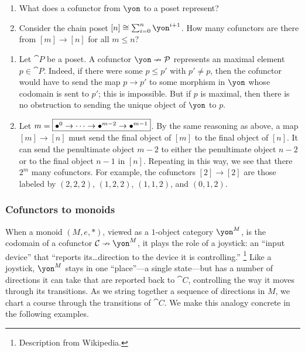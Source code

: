 \documentclass[Book-Poly]{subfiles}
\begin{document}
\begin{exercise}
\begin{enumerate}
	\item What does a cofunctor from $\yon$ to a poset represent?
	\item Consider the chain poset $[n]\cong\sum_{i=0}^n\yon^{i+1}$.
	How many cofunctors are there from $[m]\to[n]$ for all $m\leq n$?
\qedhere
\end{enumerate}
\begin{solution}
\begin{enumerate}
    \item Let $\cat{P}$ be a poset. A cofunctor $\yon\cof\cat{P}$ represents an maximal element $p\in\cat{P}$. Indeed, if there were some $p\leq p'$ with $p'\neq p$, then the cofunctor would have to send the map $p\to p'$ to some morphism in $\yon$ whose codomain is sent to $p'$; this is impossible. But if $p$ is maximal, then there is no obstruction to sending the unique object of $\yon$ to $p$.
   \item Let $m=\fbox{$\bullet^0\to\cdots\to\bullet^{m-2}\to\bullet^{m-1}$}$. By the same reasoning as above, a map $[m]\to[n]$ must send the final object of $[m]$ to the final object of $[n]$. It can send the penultimate object $m-2$ to either the penultimate object $n-2$ or to the final object $n-1$ in $[n]$. Repeating in this way, we see that there $2^m$ many cofunctors. For example, the cofunctors $[2]\to[2]$ are those labeled by $(2,2,2)$, $(1,2,2)$, $(1,1,2)$, and $(0,1,2)$.
 \end{enumerate}
\end{solution}
\end{exercise}

\subsubsection{Cofunctors to monoids}

When a monoid $(M,e,*)$, viewed as a $1$-object category $\yon^M$, is the codomain of a cofunctor $\cat{C}\cof\yon^M$, it plays the role of a joystick: an ``input device'' that ``reports its\dots direction to the device it is controlling.''%
\footnote{Description from Wikipedia.} %
Like a joystick, $\yon^M$ stays in one ``place''---a single state---but has a number of directions it can take that are reported back to $\cat{C}$, controlling the way it moves through its transitions.
As we string together a sequence of directions in $M$, we chart a course through the transitions of $\cat C$.
We make this analogy concrete in the following examples.
\end{document}
